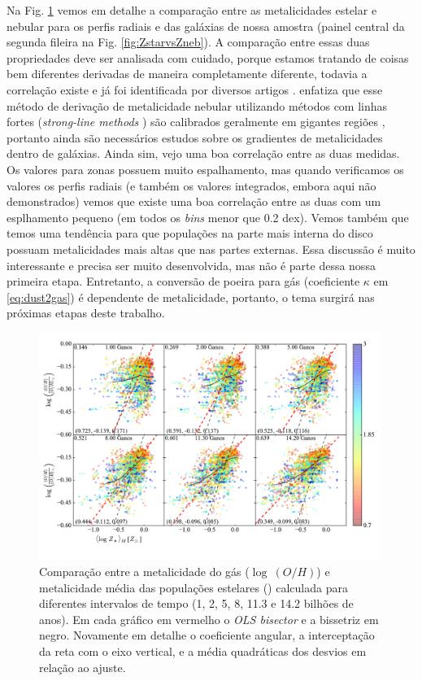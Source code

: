 Na Fig. \ref{fig:compareZR} vemos em detalhe a comparação entre as metalicidades estelar e nebular
para os perfis radiais e das galáxias de nossa amostra (painel central da segunda fileira na Fig.
\ref{fig:ZstarvsZneb}). A comparação entre essas duas propriedades deve ser analisada com cuidado,
porque estamos tratando de coisas bem diferentes derivadas de maneira completamente diferente,
todavia a correlação existe e já foi identificada por diversos artigos
\citep{CidFernandes.etal.2005a, Gallazzi.etal.2005a, CidFernandes.etal.2007a, Asari.etal.2007a}.
\citet{Stasinska.etal.2006a} enfatiza que esse método de derivação de metalicidade nebular
utilizando métodos com linhas fortes ({\em strong-line methods} \citep{Pagel.etal.1979a}) são
calibrados geralmente em gigantes regiões \Hii, portanto ainda são necessários estudos sobre os
gradientes de metalicidades dentro de galáxias. Ainda sim, vejo uma boa correlação entre as duas
medidas. Os valores para zonas possuem muito espalhamento, mas quando verificamos os valores os
perfis radiais (e também os valores integrados, embora aqui não demonstrados) vemos que existe uma
boa correlação entre as duas com um esplhamento pequeno (em todos os {\em bins} menor que 0.2 dex).
Vemos também que temos uma tendência para que populações na parte mais interna do disco possuam
metalicidades mais altas que nas partes externas. Essa discussão é muito interessante e precisa ser
muito desenvolvida, mas não é parte dessa nossa primeira etapa. Entretanto, a conversão de poeira
para gás (coeficiente $\kappa$ em \eqref{eq:dust2gas}) é dependente de metalicidade, portanto, o
tema surgirá nas próximas etapas deste trabalho.

\begin{figure}
	\centering
	\includegraphics[width=0.99\textwidth]{figuras/CompareZR.pdf}
	\caption[ vs. $\log\ (O/H)$ - perfis radiais]
	{Comparação entre a metalicidade do gás ($\log\ (O/H)$) e metalicidade média das populações
estelares () calculada para diferentes intervalos de tempo (1, 2, 5, 8, 11.3 e
14.2 bilhões de anos). Em cada gráfico em vermelho o {\em OLS bisector} e a bissetriz em negro.
Novamente em detalhe o coeficiente angular, a interceptação da reta com o eixo vertical, e a média
quadráticas dos desvios em relação ao ajuste.}
	\label{fig:compareZR}
\end{figure}

